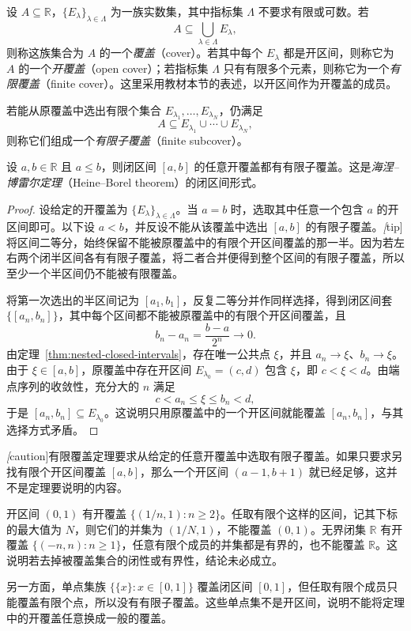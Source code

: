 \begin{definition}
\label{def:open-cover-and-finite-subcover}
设 $A\subseteq\mathbb{R}$，$\{E_\lambda\}_{\lambda\in\Lambda}$ 为一族实数集，其中指标集 $\Lambda$ 不要求有限或可数。若
\[
    A\subseteq\bigcup_{\lambda\in\Lambda}E_\lambda,
\]
则称这族集合为 $A$ 的一个\emph{覆盖}（cover）。若其中每个 $E_\lambda$ 都是开区间，则称它为 $A$ 的一个\emph{开覆盖}（open cover）；若指标集 $\Lambda$ 只有有限多个元素，则称它为一个\emph{有限覆盖}（finite cover）。这里采用教材本节的表述，以开区间作为开覆盖的成员。

若能从原覆盖中选出有限个集合 $E_{\lambda_1},\ldots,E_{\lambda_N}$，仍满足
\[
    A\subseteq E_{\lambda_1}\cup\cdots\cup E_{\lambda_N},
\]
则称它们组成一个\emph{有限子覆盖}（finite subcover）。
\end{definition}

\begin{theorem}[有限覆盖定理]
\label{thm:finite-covering}
设 $a,b\in\mathbb{R}$ 且 $a\leq b$，则闭区间 $[a,b]$ 的任意开覆盖都有有限子覆盖。这是\emph{海涅--博雷尔定理}（Heine--Borel theorem）的闭区间形式。
\end{theorem}

\begin{proof}
设给定的开覆盖为 $\{E_\lambda\}_{\lambda\in\Lambda}$。当 $a=b$ 时，选取其中任意一个包含 $a$ 的开区间即可。以下设 $a<b$，并反设不能从该覆盖中选出 $[a,b]$ 的有限子覆盖。\emph[tip]{将区间二等分，始终保留不能被原覆盖中的有限个开区间覆盖的那一半。}因为若左右两个闭半区间各有有限子覆盖，将二者合并便得到整个区间的有限子覆盖，所以至少一个半区间仍不能被有限覆盖。

将第一次选出的半区间记为 $[a_1,b_1]$，反复二等分并作同样选择，得到闭区间套 $\{[a_n,b_n]\}$，其中每个区间都不能被原覆盖中的有限个开区间覆盖，且
\[
    b_n-a_n=\frac{b-a}{2^n}\longrightarrow0.
\]
由定理~\ref{thm:nested-closed-intervals}，存在唯一公共点 $\xi$，并且 $a_n\to\xi$、$b_n\to\xi$。由于 $\xi\in[a,b]$，原覆盖中存在开区间 $E_{\lambda_0}=(c,d)$ 包含 $\xi$，即 $c<\xi<d$。由端点序列的收敛性，充分大的 $n$ 满足
\[
    c<a_n\leq\xi\leq b_n<d,
\]
于是 $[a_n,b_n]\subseteq E_{\lambda_0}$。这说明只用原覆盖中的一个开区间就能覆盖 $[a_n,b_n]$，与其选择方式矛盾。
\end{proof}

\begin{remark}
\emph[caution]{有限覆盖定理要求从给定的任意开覆盖中选取有限子覆盖。}如果只要求另找有限个开区间覆盖 $[a,b]$，那么一个开区间 $(a-1,b+1)$ 就已经足够，这并不是定理要说明的内容。

开区间 $(0,1)$ 有开覆盖 $\{(1/n,1):n\geq2\}$。任取有限个这样的区间，记其下标的最大值为 $N$，则它们的并集为 $(1/N,1)$，不能覆盖 $(0,1)$。无界闭集 $\mathbb{R}$ 有开覆盖 $\{(-n,n):n\geq1\}$，任意有限个成员的并集都是有界的，也不能覆盖 $\mathbb{R}$。这说明若去掉被覆盖集合的闭性或有界性，结论未必成立。

另一方面，单点集族 $\{\{x\}:x\in[0,1]\}$ 覆盖闭区间 $[0,1]$，但任取有限个成员只能覆盖有限个点，所以没有有限子覆盖。这些单点集不是开区间，说明不能将定理中的开覆盖任意换成一般的覆盖。
\end{remark}

